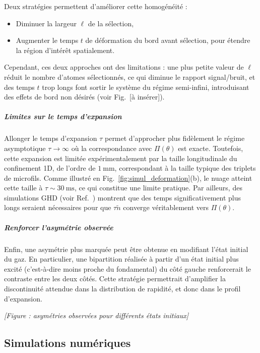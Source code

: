 Deux stratégies permettent d’améliorer cette homogénéité :
\begin{itemize}[label = $\bullet$] 
    \item Diminuer la largeur $\ell$ de la sélection,
    \item Augmenter le temps $t$ de déformation du bord avant sélection, pour étendre la région d’intérêt spatialement.
\end{itemize}
Cependant, ces deux approches ont des limitations : une plus petite valeur de $\ell$ réduit le nombre d’atomes sélectionnés, ce qui diminue le rapport signal/bruit, et des temps $t$ trop longs font sortir le système du régime semi-infini, introduisant des effets de bord non désirés (voir Fig.~[à insérer]).

\subparagraph{Limites sur le temps d’expansion}

Allonger le temps d’expansion $\tau$ permet d’approcher plus fidèlement le régime asymptotique $\tau \to \infty$ où la correspondance avec $\Pi(\theta)$ est exacte. Toutefois, cette expansion est limitée expérimentalement par la taille longitudinale du confinement 1D, de l’ordre de $1~\mathrm{mm}$, correspondant à la taille typique des triplets de microfils. Comme illustré en Fig.~\ref{fig:simul_deformation}(b), le nuage atteint cette taille à $\tau \sim 30~\mathrm{ms}$, ce qui constitue une limite pratique. Par ailleurs, des simulations GHD (voir Ref.~\cite{dubois_probing_2024}) montrent que des temps significativement plus longs seraient nécessaires pour que $\tau \tilde{n}$ converge véritablement vers $\Pi(\theta)$.

\subparagraph{Renforcer l’asymétrie observée}

Enfin, une asymétrie plus marquée peut être obtenue en modifiant l’état initial du gaz. En particulier, une bipartition réalisée à partir d’un état initial plus excité (c’est-à-dire moins proche du fondamental) du côté gauche renforcerait le contraste entre les deux côtés. Cette stratégie permettrait d’amplifier la discontinuité attendue dans la distribution de rapidité, et donc dans le profil d’expansion.

\vspace{1em}
\begin{center}
\textit{[Figure : asymétries observées pour différents états initiaux]}
\end{center}


\subsection{Simulations numériques}
\label{sec:simulations}

